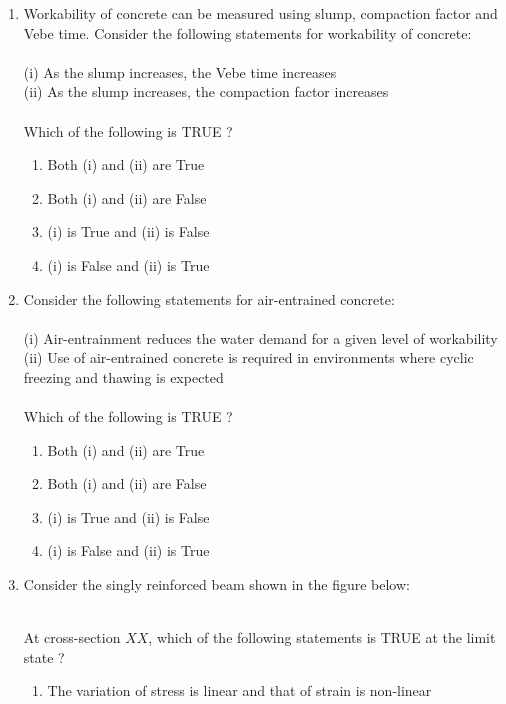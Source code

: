 \documentclass[journal]{IEEEtran}
\begin{document}
\begin{enumerate}
\item Workability of concrete can be measured using slump, compaction factor and Vebe time. Consider the following statements for workability of concrete: \\\\
(i) As the slump increases, the Vebe time increases \\
(ii) As the slump increases, the compaction factor increases \\
\\
Which of the following is TRUE ?
\begin{enumerate}
    \item Both (i) and (ii) are True
    \item Both (i) and (ii) are False
    \item (i) is True and (ii) is False
    \item (i) is False and (ii) is True \\
\end{enumerate}
\item Consider the following statements for air-entrained concrete: \\\\
(i) Air-entrainment reduces the water demand for a given level of workability \\
(ii) Use of air-entrained concrete is required in environments where cyclic freezing and thawing is expected \\
\\
Which of the following is TRUE ?
\begin{enumerate}
    \item Both (i) and (ii) are True
    \item Both (i) and (ii) are False
    \item (i) is True and (ii) is False
    \item (i) is False and (ii) is True \\
\end{enumerate}
\item Consider the singly reinforced beam shown in the figure below:
\pagebreak
\begin{figure}[!ht]
\centering
\resizebox{0.5\textwidth}{!}{%

}%
\end{figure} \\
At cross-section $XX$, which of the following statements is TRUE at the limit state ?
\begin{enumerate}
    \item The variation of stress is linear and that of strain is non-linear

\end{enumerate}
\end{enumerate}
\end{document}
